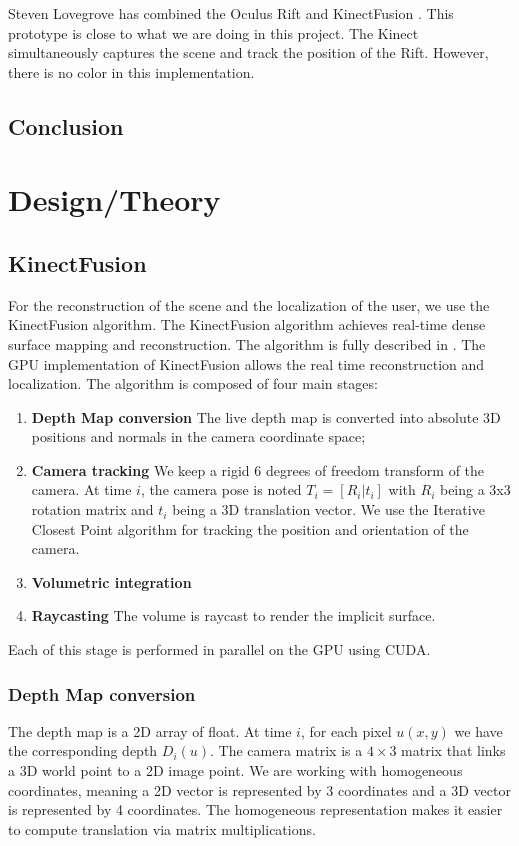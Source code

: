\documentclass[12pt]{article}
\begin{document}
Steven Lovegrove has combined the Oculus Rift and KinectFusion \cite{OculusFusion}. This prototype is close to what we are doing in this project. The Kinect simultaneously captures the scene and track the position of the Rift. However, there is no color in this implementation.

\subsection{Conclusion}


\newpage
\section{Design/Theory}
\subsection{KinectFusion}
For the reconstruction of the scene and the localization of the user, we use the KinectFusion algorithm. The KinectFusion algorithm achieves real-time dense surface mapping and reconstruction. The algorithm is fully described in \cite{KF1, KF2}. The GPU implementation of KinectFusion allows the real time reconstruction and localization. The algorithm is composed of four main stages:
\begin{enumerate}
\item \textbf{Depth Map conversion} The live depth map is converted into absolute 3D positions and normals in the camera coordinate space;
\item \textbf{Camera tracking} We keep a rigid 6 degrees of freedom transform of the camera. At time $i$, the camera pose is noted $T_i = [R_i|t_i]$ with $R_i$ being a 3x3 rotation matrix and $t_i$ being a 3D translation vector. We use the Iterative Closest Point algorithm for tracking the position and orientation of the camera.
\item \textbf{Volumetric integration}
\item \textbf{Raycasting} The volume is raycast to render the implicit surface.
\end{enumerate}

Each of this stage is performed in parallel on the GPU using CUDA.

\subsubsection{Depth Map conversion}
The depth map is a 2D array of float. At time $i$, for each pixel $u(x,y)$ we have the corresponding depth $D_i(u)$. The camera matrix is a $4\times 3$ matrix that links a 3D world point to a 2D image point. We are working with homogeneous coordinates, meaning a 2D vector is represented by 3 coordinates and a 3D vector is represented by 4 coordinates. The homogeneous representation makes it easier to compute translation via matrix multiplications.
\end{document}
